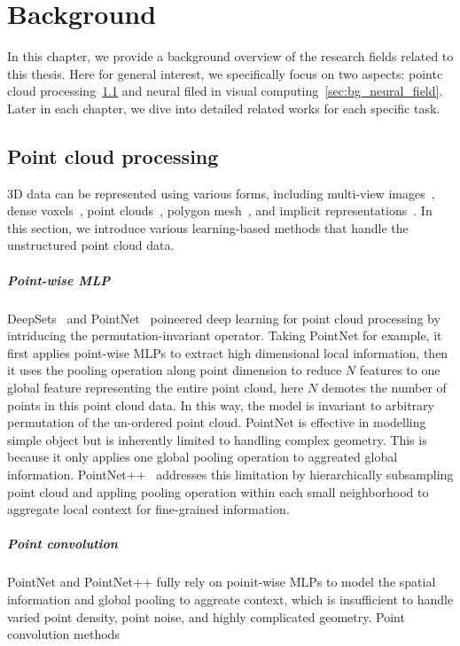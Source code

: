 \chapter{Background}
\label{chap:background}
In this chapter, we provide a background overview of the research ﬁelds related to this thesis. Here for general interest, we specifically focus on two aspects: pointc cloud processing~\cref{sec:bg_point_cloud} and neural filed in visual computing~\cref{sec:bg_neural_field}. Later in each chapter, we dive into detailed related works for each specific task.


\section{Point cloud processing}
\label{sec:bg_point_cloud}
3D data can be represented using various forms, including multi-view images~\cite{su2015multi}, dense voxels~\cite{choy20163d}, point clouds~\cite{qi2017pointnet,qi2017pointnet++}, polygon mesh~\cite{hanocka2019meshcnn}, and implicit representations~\cite{niemeyer2019occupancy,park2019deepsdf,chen2019learning}. In this section, we introduce various learning-based methods that handle the unstructured point cloud data. 

\paragraph{Point-wise MLP}
DeepSets~\cite{zaheer2017deep} and PointNet~\cite{qi2017pointnet} poineered deep learning for point cloud processing by intriducing the permutation-invariant operator. Taking PointNet for example, it first applies point-wise MLPs to extract high dimensional local information, then it uses the pooling operation along point dimension to reduce $N$ features to one global feature representing the entire point cloud, here $N$ demotes the number of points in this point cloud data. In this way, the model is invariant to arbitrary permutation of the un-ordered point cloud. PointNet is effective in modelling simple object but is inherently limited to handling complex geometry. This is because it only applies one global pooling operation to aggreated global information. PointNet++~\cite{qi2017pointnet++} addresses this limitation by hierarchically subsampling point cloud and appling pooling operation within each small neighborhood to aggregate local context for fine-grained information. 

\paragraph{Point convolution}
PointNet and PointNet++ fully rely on poinit-wise MLPs to model the spatial information and global pooling to aggreate context, which is insufficient to handle varied point density, point noise, and highly complicated geometry. Point convolution methods~\cite{thomas2019kpconv,}



